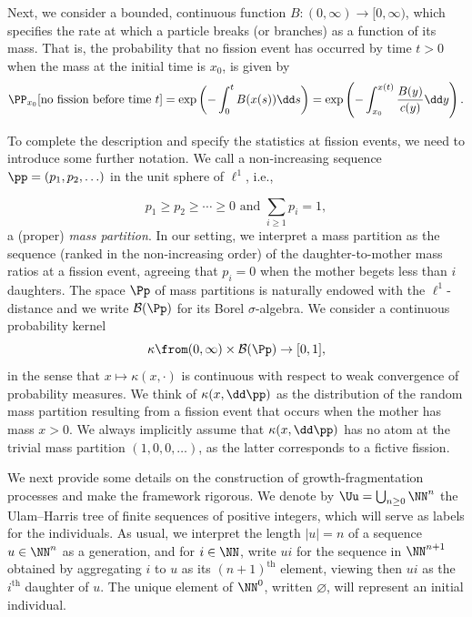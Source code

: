 Next, we consider a bounded, continuous function ${B}\colon (0,\infty)\to [0,\infty)$, which specifies the rate at which a particle breaks (or branches) as a function of its mass. That is, the probability that no fission event has occurred by time $t>0$ when the mass at the initial time is $x_0$, is given by
\[
\PP_{x_0}[\text{no fission before time }t]=\exp\left(-\int_0^t {B}(x(s))\dd s\right)=\exp\left(-\int_{x_0}^{x(t)} \frac{{B}(y)}{c(y)}\dd y\right).
\]



To complete the description and specify the statistics at fission events, we need to introduce some further notation. We call a non-increasing sequence $\pp=(p_1, p_2, \ldots)$ in the unit sphere of $\ell^1$, i.e.,


\[
p_1\geq p_2\geq \dotsb \geq 0 \text{ and } \sum_{i\geq 1}p_i= 1,
\]
a (proper) \emph{mass partition}. In our setting, we interpret a mass partition as the sequence (ranked in the non-increasing order) of the daughter-to-mother mass ratios at a fission event, agreeing that $p_i=0$ when the mother begets less than $i$ daughters. The space $\Pp$ of mass partitions is naturally endowed with the $\ell^1$-distance and we write ${\mathcal B}(\Pp)$ for its Borel $\sigma$-algebra. We consider a continuous probability kernel
\[
\kappa \from (0,\infty)\times {\mathcal B}(\Pp) \to [0,1],
\]
in the sense that $x \mapsto \kappa(x,\cdot)$ is continuous with respect to weak convergence of probability measures. We think of $\kappa (x,\dd \pp)$ as the distribution of the random mass partition resulting from a fission event that occurs when the mother has mass $x>0$. We always implicitly assume that $\kappa(x, \dd \pp)$ has no atom at the trivial mass partition $(1,0,0, \ldots)$, as the latter corresponds to a fictive fission.


We next provide some details on the construction of growth-fragmentation processes and make the framework rigorous. We denote by $\Uu = \bigcup_{n\ge 0} \NN^n$ the Ulam--Harris tree of finite sequences of positive integers, which will serve as labels for the individuals. As usual, we interpret the length $|u|=n$ of a sequence $u\in\NN^n$ as a generation, and for $i\in\NN$, write $ui$ for the sequence in $\NN^{n+1}$ obtained by aggregating $i$ to $u$ as its $(n+1)^{\text{th}}$ element, viewing then $ui$ as the $i^{\text{th}}$ daughter of $u$. The unique element of $\NN^0$, written $\varnothing$, will represent an initial individual.

